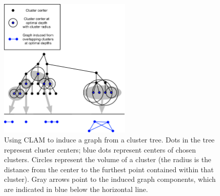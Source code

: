 

\begin{figure}[ht!]
    \centering
    \includegraphics[width=2.5in]{images/tree-graph.pdf}
    \caption{Using CLAM to induce a graph from a cluster tree.
        Dots in the tree represent cluster centers;
        blue dots represent centers of chosen clusters.
        Circles represent the volume of a cluster (the radius is the distance from the center to the furthest point contained within that cluster).
        Gray arrows point to the induced graph components, which are indicated in blue below the horizontal line.}
    \label{fig:methods:graph-generation}
\end{figure}



